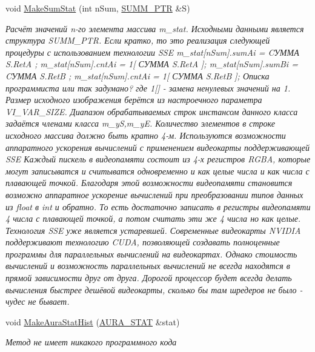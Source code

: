 \begin{DoxyCompactItemize}
void \hyperlink{class_c_v_i_engine_thread_a6e69080c6da14f8bb61c0615180bd088}{Make\+Sum\+Stat} (int n\+Sum, \hyperlink{struct_c_v_i_engine_thread_1_1tag_s_u_m_m___p_t_r}{S\+U\+M\+M\+\_\+\+P\+T\+R} \&S)
\begin{DoxyCompactList}\small\item\em Расчёт значений n-\/го элемента массива m\+\_\+stat. Исходными данными является структура S\+U\+M\+M\+\_\+\+P\+T\+R. Если кратко, то это реализация следующей процедуры с использованием технологии S\+S\+E m\+\_\+stat\mbox{[}n\+Sum\mbox{]}.sum\+Ai = CУММА S.\+Ret\+A ; m\+\_\+stat\mbox{[}n\+Sum\mbox{]}.cnt\+Ai = 1\mbox{[} СУММА S.\+Ret\+A \mbox{]}; m\+\_\+stat\mbox{[}n\+Sum\mbox{]}.sum\+Bi = CУММА S.\+Ret\+B ; m\+\_\+stat\mbox{[}n\+Sum\mbox{]}.cnt\+Ai = 1\mbox{[} СУММА S.\+Ret\+B \mbox{]}; Описка программиста или так задумано? где 1\mbox{[}\mbox{]} -\/ замена ненулевых значений на 1. Размер исходного изображения берётся из настроечного параметра V\+I\+\_\+\+V\+A\+R\+\_\+\+S\+I\+Z\+E. Диапазон обрабатываемых строк инстансом данного класса задаётся членами класса m\+\_\+y\+S,m\+\_\+y\+E. Количество элементов в строке исходного массива должно быть кратно 4-\/м. Используются возможности аппаратного ускорения вычислений с применением видеокарты поддерживающей S\+S\+E Каждый пискель в видеопамяти состоит из 4-\/х регистров R\+G\+B\+A, которые могут записыватся и считыватся одновременно и как целые числа и как числа с плавающей точкой. Благодаря этой возможности видеопамяти становится возможно аппаратное ускорение вычислений при преобразовании типов данных из float в int и обратно. То есть достаточно записать в регистры видеопамяти 4 числа с плавающей точкой, а потом считать эти же 4 числа но как целые. Технология S\+S\+E уже является устаревшей. Современные видеокарты N\+V\+I\+D\+I\+A поддерживают технологию C\+U\+D\+A, позволяющей создавать полноценные программы для параллельных вычислений на видеокартах. Однако стоимость вычислений и возможность параллельных вычислений не всегда находятся в прямой зависимости друг от друга. Дорогой процессор будет всегда делать вычисления быстрее дешёвой видеокарты, сколько бы там шредеров не было -\/ чудес не бывает. \end{DoxyCompactList}\item 
void \hyperlink{class_c_v_i_engine_thread_ac5a7ba8ea2d72478af174b471d73fd5c}{Make\+Aura\+Stat\+Hist} (\hyperlink{class_a_u_r_a___s_t_a_t}{A\+U\+R\+A\+\_\+\+S\+T\+A\+T} \&stat)
\begin{DoxyCompactList}\small\item\em Метод не имеет никакого программного кода \end{DoxyCompactList}\item 

\end{DoxyCompactItemize}
